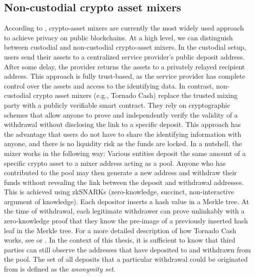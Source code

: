 \documentclass[12pt,a4paper,titlepage,oneside,english]{article}
\begin{document}
\subsection{Non-custodial crypto asset mixers}
According to \cite{nadler2023tornado}, crypto-asset mixers are currently the most widely used approach to achieve privacy on public blockchains. At a high level, we can distinguish between custodial and non-custodial crypto-asset mixers. \newline
In the custodial setup, users send their assets to a centralized service provider's public deposit address. After some delay, the provider returns the assets to a privately relayed recipient address. This approach is fully trust-based, as the service provider has complete control over the assets and access to the identifying data. \citep{nadler2023tornado} \newline 
In contrast, non-custodial crypto asset mixers (e.g., Tornado Cash) replace the trusted mixing party with a publicly verifiable smart contract. They rely on cryptographic schemes that allow anyone to prove and independently verify the validity of a withdrawal without disclosing the link to a specific deposit. This approach has the advantage that users do not have to share the identifying information with anyone, and there is no liquidity risk as the funds are locked. \citep{nadler2023tornado} \newline
In a nutshell, the mixer works in the following way: Various entities deposit the same amount of a specific crypto asset to a mixer address acting as a pool. Anyone who has contributed to the pool may then generate a new address and withdraw their funds without revealing the link between the deposit and withdrawal addresses. This is achieved using zkSNARKs (zero-knowledge, succinct, non-interactive argument of knowledge). 
Each depositor inserts a hash value in a Merkle tree. At the time of withdrawal, each legitimate withdrawer can prove unlinkably with a zero-knowledge proof that they know the pre-image of a previously inserted hash leaf in the Merkle tree. %
 For a more detailed description of how Tornado Cash works, see \cite{nadler2023tornado} or \cite{Beres2020}. \newline
In the context of this thesis, it is sufficient to know that third parties can still observe the addresses that have deposited to and withdrawn from the pool. The set of all deposits that a particular withdrawal could be originated from is defined as the \textit{anonymity set}. 
\end{document}
